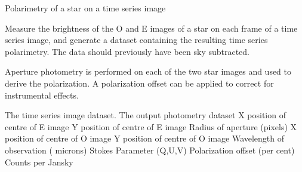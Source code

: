 \begin{manroutinedescription}
        Polarimetry of a star on a time series image

        Measure the brightness of the O and E images of a star on each
        frame of a time series image, and generate a {} {} %
dataset
        containing the resulting time series polarimetry. The data should
        previously have been sky subtracted.

        Aperture photometry is performed on each of the two star images
        and used to derive the polarization. A polarization offset can
        be applied to correct for instrumental effects.

\begin{manparametertable}
   The time %
series image dataset.
   The %
output photometry dataset
      X position of centre of E image
      Y position of centre of E image
      Radius of aperture (pixels)
      X position of centre of O image
      Y position of centre of O image
      Wavelength of observation (%
microns)
      Stokes Parameter (Q,U,V)
      Polarization offset (per %
cent)
      Counts per Jansky

\end{manparametertable}
\end{manroutinedescription}
